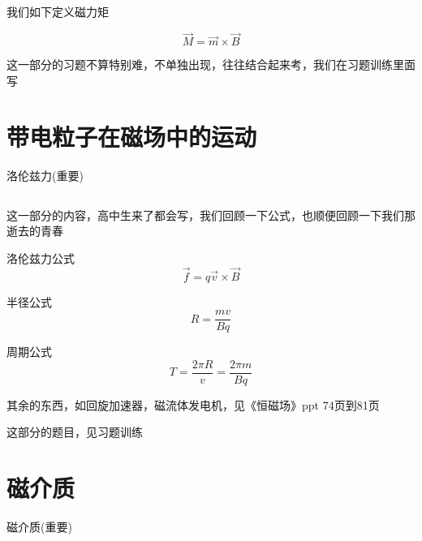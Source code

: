 \documentclass[lang=cn,10pt]{elegantbook}
\begin{document}
		\subsection{\color{red}}
		我们如下定义磁力矩
		\begin{definition}[磁矩]
			\begin{equation}
				\overrightarrow{M}=\overrightarrow{m}\times \overrightarrow{B}
			\end{equation}		
		\end{definition}
		
		这一部分的习题不算特别难，不单独出现，往往结合起来考，我们在习题训练里面写
	\section{带电粒子在磁场中的运动}
	\begin{introduction}
		\item 洛伦兹力(重要)
	\end{introduction}
	\subsection{\color{red}}
	这一部分的内容，高中生来了都会写，我们回顾一下公式，也顺便回顾一下我们那逝去的青春
	
	洛伦兹力公式
	\begin{equation*}
		\overrightarrow{f}=q\overrightarrow{v}\times \overrightarrow{B}
	\end{equation*}
	
	半径公式
	\begin{equation*}
		R=\frac{mv}{Bq}
	\end{equation*}
	
	周期公式
	\begin{equation*}
		T=\frac{2\pi R}{v}=\frac{2\pi m}{Bq}
	\end{equation*}
	
	其余的东西，如回旋加速器，磁流体发电机，见《恒磁场》ppt 74页到81页
	
	这部分的题目，见习题训练
	\section{磁介质}
	\begin{introduction}
		\item 磁介质(重要)
	\end{introduction}	
\end{document}

